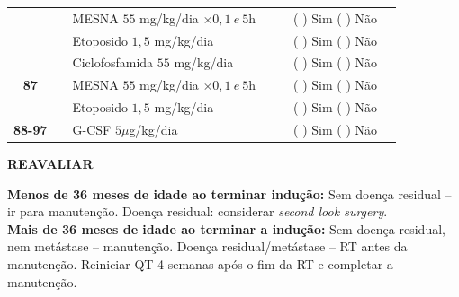 \documentclass[11pt,a4paper,oldfontcommands]{memoir}
\begin{document}
\begin{center}
\begin{longtable}{p{1cm}c|p{5cm}|p{1.5cm}p{1.5cm}|c|c}
    \multicolumn{1}{c|}{}&&{MESNA \(55\) mg/kg/dia \(\times 0,1 \:e\: 5\)h}&&&{(  ) Sim (  ) Não}&\\
    \multicolumn{1}{c|}{}&&{Etoposido \(1,5\) mg/kg/dia}&&&{(  ) Sim (  ) Não}&\\
    \hline
    \multicolumn{1}{c|}{\multirow{3}{*}{\textbf{87}}}&&{Ciclofosfamida \(55\) mg/kg/dia}&{}&&{(  ) Sim (  ) Não}&\\
    \multicolumn{1}{c|}{}&&{MESNA \(55\) mg/kg/dia \(\times 0,1 \:e\: 5\)h}&&&{(  ) Sim (  ) Não}&\\
    \multicolumn{1}{c|}{}&\multirow{1}{*}{}&{Etoposido \(1,5\) mg/kg/dia}&{}&&{(  ) Sim (  ) Não}&\\
    \hline
    \multicolumn{1}{c|}{\textbf{88-97}}&&{G-CSF \(5 \mu\)g/kg/dia }&&&{(  ) Sim (  ) Não}&\\
    \hline
\end{longtable}
\textbf{REAVALIAR}
\end{center}
\textbf{Menos de 36 meses de idade ao terminar indução:} Sem doença residual – ir para manutenção. Doença residual: considerar \textit{second look surgery}.\\
\textbf{Mais de 36 meses de idade ao terminar a indução:} Sem doença residual, nem metástase – manutenção. Doença residual/metástase – RT antes da manutenção. Reiniciar QT 4 semanas após o fim da RT e completar a manutenção.

\clearpage
\end{document}
